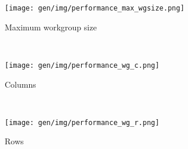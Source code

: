 \begin{subfigure}[h]{\textwidth}
\centering
\texttt{[image: gen/img/performance\_max\_wgsize.png]}
\vspace{-1.5em} %
\caption{Maximum workgroup size}
\label{fig:performance-max-wgsize}
\end{subfigure}
\\
\begin{subfigure}[h]{.48\textwidth}
\centering
\texttt{[image: gen/img/performance\_wg\_c.png]}
\vspace{-1.5em} %
\caption{Columns}
\label{fig:performance-wg-c}
\end{subfigure}
~%
\begin{subfigure}[h]{.48\textwidth}
\centering
\texttt{[image: gen/img/performance\_wg\_r.png]}
\vspace{-1.5em} %
\caption{Rows}
\label{fig:performance-wg-r}
\end{subfigure}
